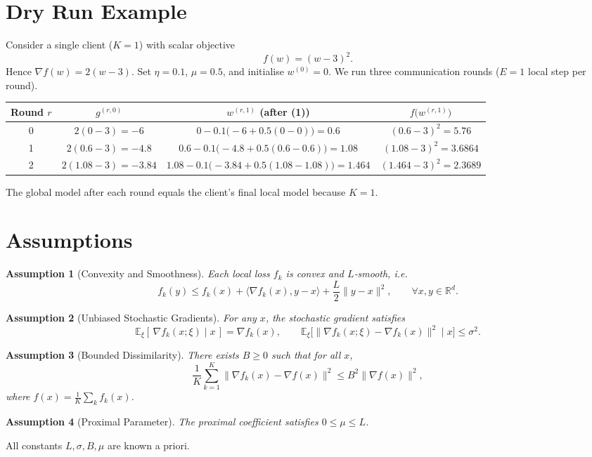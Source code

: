 \documentclass{article}
\newtheorem{assumption}{Assumption}
\newcommand{\E}{\mathbb{E}}
\newcommand{\R}{\mathbb{R}}
\begin{document}
\section*{Dry Run Example}
Consider a single client ($K=1$) with scalar objective
\[
f(w) = (w-3)^2 .
\]
Hence $\nabla f(w)=2(w-3)$.  
Set $\eta=0.1$, $\mu=0.5$, and initialise $w^{(0)}=0$.  
We run three communication rounds ($E=1$ local step per round).

\begin{center}
\begin{tabular}{c|c|c|c}
Round $r$ & $g^{(r,0)}$ & $w^{(r,1)}$ (after (1)) & $f\big(w^{(r,1)}\big)$\\ \hline
0 & $2(0-3)=-6$ & $0-0.1\big(-6+0.5(0-0)\big)=0.6$ & $(0.6-3)^2=5.76$\\
1 & $2(0.6-3)=-4.8$ & $0.6-0.1\big(-4.8+0.5(0.6-0.6)\big)=1.08$ & $(1.08-3)^2=3.6864$\\
2 & $2(1.08-3)=-3.84$ & $1.08-0.1\big(-3.84+0.5(1.08-1.08)\big)=1.464$ & $(1.464-3)^2=2.3689$\\
\end{tabular}
\end{center}
The global model after each round equals the client’s final local model because $K=1$.

\section*{Assumptions}
\begin{assumption}[Convexity and Smoothness]\label{ass:convex}
Each local loss $f_k$ is convex and $L$‑smooth, i.e.
\[
f_k(y)\le f_k(x)+\langle \nabla f_k(x),y-x\rangle+\frac{L}{2}\|y-x\|^2,\qquad\forall x,y\in\R^d .
\]
\end{assumption}
\begin{assumption}[Unbiased Stochastic Gradients]\label{ass:unbiased}
For any $x$, the stochastic gradient satisfies
\[
\E_{\xi}[\,\nabla f_k(x;\xi)\mid x\,]=\nabla f_k(x),\qquad 
\E_{\xi}\big[\|\nabla f_k(x;\xi)-\nabla f_k(x)\|^2\mid x\big]\le\sigma^2 .
\]
\end{assumption}
\begin{assumption}[Bounded Dissimilarity]\label{ass:dissim}
There exists $B\ge0$ such that for all $x$,
\[
\frac{1}{K}\sum_{k=1}^{K}\|\nabla f_k(x)-\nabla f(x)\|^2\le B^2\|\nabla f(x)\|^2,
\]
where $f(x)=\frac1K\sum_k f_k(x)$.
\end{assumption}
\begin{assumption}[Proximal Parameter]\label{ass:mu}
The proximal coefficient satisfies $0\le \mu\le L$.
\end{assumption}
All constants $L,\sigma,B,\mu$ are known a priori.
\end{document}
